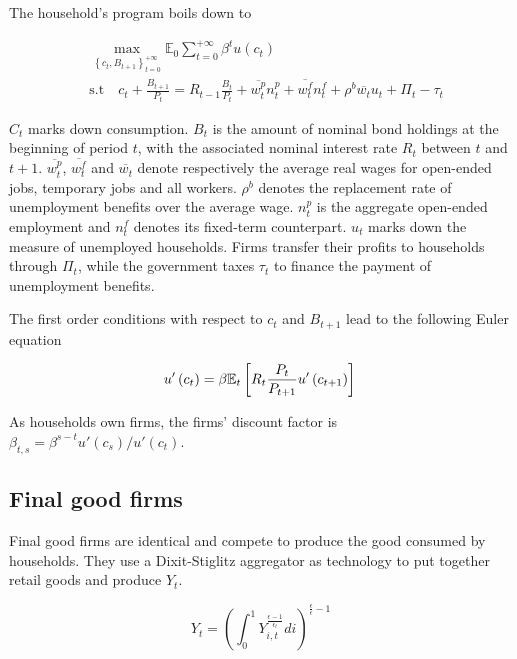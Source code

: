 The household's program boils down to

\begin{align*}
&\max_{\left\{c_t, B_{t+1} \right\}_{t=0}^{+\infty}} \mathbb{E}_0 \sum_{t = 0}^{+\infty} \beta^t u\left(c_t\right)\\
&\text{s.t} \quad c_t + \frac{B_{t+1}}{P_t} = R_{t-1} \frac{B_{t}}{P_t} + \overline{w_t^p} n_t^p + \overline{w_t^f} n_t^f + \rho^b \overline{w_t} u_t + \Pi_t - \tau_t
\end{align*}

$C_t$ marks down consumption. $B_{t}$ is the amount of nominal bond holdings at the beginning of period $t$, with the associated nominal interest rate $R_t$ between $t$ and $t+1$. $\overline{w_t^p}$, $\overline{w_t^f}$ and $\overline{w_t}$ denote respectively the average real wages for open-ended jobs, temporary jobs and all workers. $\rho^b$ denotes the replacement rate of unemployment benefits over the average wage. $n_t^p$ is the aggregate open-ended employment and $n_t^f$ denotes its fixed-term counterpart. $u_t$ marks down the measure of unemployed households. Firms transfer their profits to households through $\Pi_t$, while the government taxes $\tau_t$ to finance the payment of unemployment benefits.

The first order conditions with respect to $c_t$ and $B_{t+1}$ lead to the following Euler equation

\begin{equation}
u' \left( c_t \right) = \beta \mathbb{E}_t \left[ R_{t} \frac{P_t}{P_{t+1}} u' \left( c_{t+1} \right) \right] \label{eq:euler_eq}\\
\end{equation}

As households own firms, the firms' discount factor is $\beta_{t,s} = \beta^{s-t} u' \left( c_s \right) / u' \left( c_t \right)$.

\subsection{Final good firms}

Final good firms are identical and compete to produce the good consumed by households. They use a Dixit-Stiglitz aggregator as technology to put together retail goods and produce $Y_t$.

\begin{equation}
Y_t = \left( \int_{0}^{1} Y_{i,t}^{\frac{\epsilon - 1}{\epsilon_t}} di \right)^{\frac{\epsilon}{\epsilon} - 1} \label{con_fin}
\end{equation}

